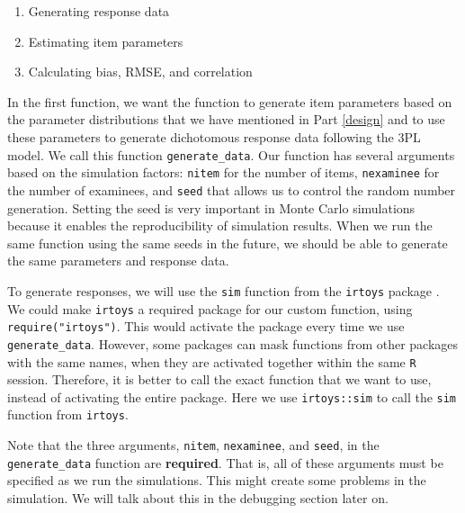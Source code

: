 \documentclass[
]{book}
\providecommand{\tightlist}{%
  \setlength{\itemsep}{0pt}\setlength{\parskip}{0pt}}
\begin{document}
\begin{enumerate}
\def\labelenumi{\arabic{enumi}.}
\tightlist
\item
  Generating response data
\item
  Estimating item parameters
\item
  Calculating bias, RMSE, and correlation
\end{enumerate}

In the first function, we want the function to generate item parameters based on the parameter distributions that we have mentioned in Part \ref{design} and to use these parameters to generate dichotomous response data following the 3PL model. We call this function \texttt{generate\_data}. Our function has several arguments based on the simulation factors: \texttt{nitem} for the number of items, \texttt{nexaminee} for the number of examinees, and \texttt{seed} that allows us to control the random number generation. Setting the seed is very important in Monte Carlo simulations because it enables the reproducibility of simulation results. When we run the same function using the same seeds in the future, we should be able to generate the same parameters and response data.

To generate responses, we will use the \texttt{sim} function from the \texttt{irtoys} package \citep{R-irtoys}. We could make \texttt{irtoys} a required package for our custom function, using \texttt{require("irtoys")}. This would activate the package every time we use \texttt{generate\_data}. However, some packages can mask functions from other packages with the same names, when they are activated together within the same \texttt{R} session. Therefore, it is better to call the exact function that we want to use, instead of activating the entire package. Here we use \texttt{irtoys::sim} to call the \texttt{sim} function from \texttt{irtoys}.

Note that the three arguments, \texttt{nitem}, \texttt{nexaminee}, and \texttt{seed}, in the \texttt{generate\_data} function are \textbf{required}. That is, all of these arguments must be specified as we run the simulations. This might create some problems in the simulation. We will talk about this in the debugging section later on.
\end{document}
